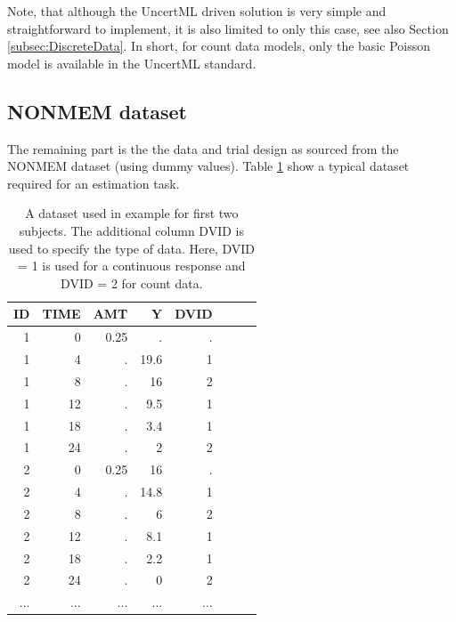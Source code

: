 Note, that although the UncertML driven solution is very simple and straightforward
to implement, it is also limited to only this case, see also Section \ref{subsec:DiscreteData}. 
In short, for count data models, only the basic Poisson model is available in the UncertML standard.


\subsection{NONMEM dataset}
\label{sec:eg6-NONMEMdataset}
The remaining part is the the data and trial design as sourced from the 
NONMEM dataset (using dummy values). Table \ref{tab:example6_dataSet} show a typical dataset required for 
an estimation task.
\begin{table}[htdp]
\begin{center}
\small
\renewcommand{\arraystretch}{1.1}%
\begin{tabular}{rrrrrrrr}\toprule
ID 	& TIME	& AMT	& Y		& DVID \\ \midrule
1 	& 0 		& 0.25 	& . 		& . \\ 
1 	& 4 		& . 		& 19.6 	& 1 \\ 
1 	& 8 		& . 		& 16 	& 2 \\ 
1 	& 12 	& . 		& 9.5 	& 1 \\ 
1 	& 18 	& . 		& 3.4 	& 1 \\ 
1 	& 24 	& . 		& 2 		& 2 \\ 
2 	& 0 		& 0.25	& 16 	& . \\ 
2 	& 4 		& . 		& 14.8 	& 1 \\ 
2 	& 8 		& . 		& 6 		& 2 \\ 
2 	& 12 	& . 		& 8.1 	& 1 \\ 
2 	& 18 	& . 		& 2.2 	& 1 \\ 
2 	& 24 	& . 		& 0 		& 2 \\ 
...	& ...		& ...		& ...		& ...	\\ \bottomrule
\end{tabular}
\end{center}
\caption{A dataset used in example for first two subjects.
The additional column DVID is used to specify the type of data. Here, 
DVID = 1 is used for a continuous response and DVID = 2 for count data.}
\label{tab:example6_dataSet}
\end{table}%

